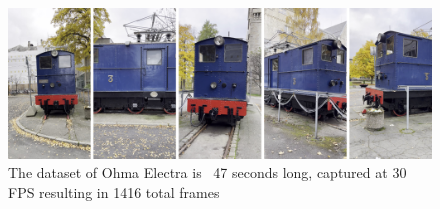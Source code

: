 \begin{figure}[h]
    \centering
    \includegraphics[width=1.0\textwidth]{figures/ohma_electra.png}
    \caption{The dataset of Ohma Electra is ~47 seconds long, captured at 30 FPS resulting in 1416 total frames}
    \label{fig:ohma-electra}
\end{figure}